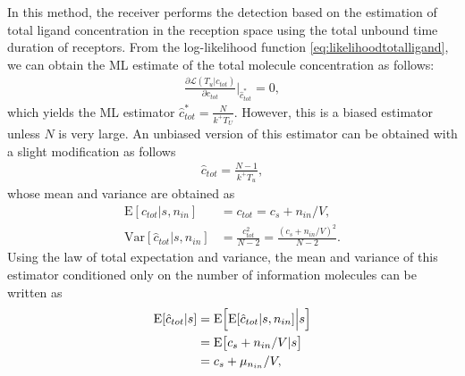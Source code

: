 \documentclass[twocolumn]{IEEEtran}
\newcommand{\E}{\mathrm{E}}
\newcommand{\Var}{\mathrm{Var}}
\begin{document}
In this method, the receiver performs the detection based on the estimation of total ligand concentration in the reception space using the total unbound time duration of receptors. From the log-likelihood function \eqref{eq:likelihoodtotalligand}, we can obtain the ML estimate of the total molecule concentration as follows: 
\begin{align}
\frac{\partial \mathcal{L}\left(T_u | c_{tot}\right)}{\partial c_{tot}} \bigg|_{\hat{c}_{tot}^\ast} = 0,
\end{align}
which yields the ML estimator $\hat{c}_{tot}^\ast = \frac{N}{k^+ T_U}$. However, this is a biased estimator unless $N$ is very large. An unbiased version of this estimator can be obtained with a slight modification \cite{kuscu2018maximum} as follows
\begin{align}
\hat{c}_{tot} =  \frac{N-1}{k^+ T_u} \label{ctot_estimator},
\end{align}
whose mean and variance are obtained as 
\begin{align}
\E[\hat{c}_{tot}|s, n_{in}] &=  c_{tot} = c_s + n_{in}/V \label{Tu_mean},\\
\Var[\hat{c}_{tot}|s, n_{in}] &= \frac{c_{tot}^2}{N - 2}  = \frac{(c_s + n_{in}/V )^2}{N -2}\label{Tu_variance}.
\end{align}
Using the law of total expectation and variance, the mean and variance of this estimator conditioned only on the number of information molecules can be written as 
\begin{align}
\E[\hat{c}_{tot}|s] &=  \E\Bigl[\E[\hat{c}_{tot}|s, n_{in}]\Big|s\Bigr] \\ \nonumber
&= \E\bigr[c_s + n_{in}/V|s\bigr] \\ \nonumber
&= c_s + \mu_{n_{in}}/V,
\end{align}
\end{document}

